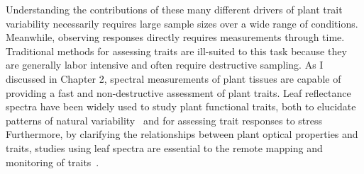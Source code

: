 Understanding the contributions of these many different drivers of plant trait variability necessarily requires large sample sizes over a wide range of conditions.
Meanwhile, observing responses directly requires measurements through time.
Traditional methods for assessing traits are ill-suited to this task because they are generally labor intensive and often require destructive sampling.
As I discussed in Chapter 2, spectral measurements of plant tissues are capable of providing a fast and non-destructive assessment of plant traits.
Leaf reflectance spectra have been widely used to study plant functional traits,
both to elucidate patterns of natural variability~\cite{cavenderbares_2017_harnessing,asner_2015_quantifying}
and for assessing trait responses to stress~\cite{serbin_spectroscopic_2014,bayat_2016_remote,sun_2018_reflectance}
Furthermore, by clarifying the relationships between plant optical properties and traits, studies using leaf spectra are essential to the remote mapping and monitoring of traits~\cite{schneider2017_mapping,schimel2013_observing,schimel2015_observing,jetz2016_diversity}.

